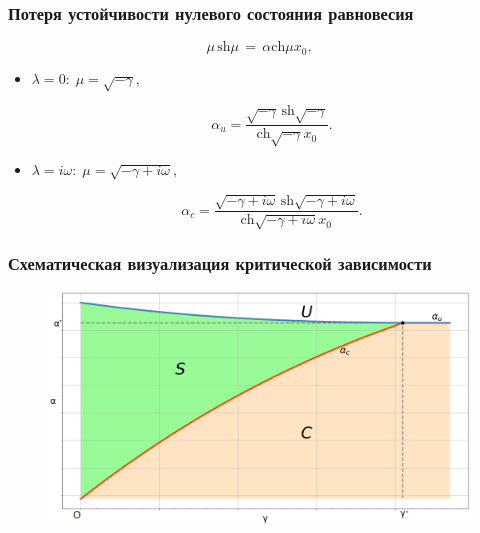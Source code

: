 \documentclass[fullscreen=true, unicode, bookmarks=false]{beamer}
\begin{document}
\begin{frame}
\frametitle{ Потеря устойчивости нулевого состояния равновесия }
 
\begin{equation}
	\mu \, \mbox{sh} \mu \, = \, \alpha \mbox{ch} \mu x_0,
\end{equation}

\medskip
\pause

\begin{itemize}

\item { $ \lambda = 0: \; \mu = \sqrt{-\gamma}, $ 
}

$$ \alpha_u = \frac{ \sqrt{-\gamma} \, \mbox{sh} \sqrt{-\gamma} }{ \mbox{ch} \sqrt{-\gamma} x_0 }. $$

\pause
\item { $ \lambda = i \omega: \; \mu = \sqrt{-\gamma + i \omega}, $ 
}

$$ \alpha_c = \frac{ \sqrt{-\gamma + i \omega} \, \mbox{sh} \sqrt{-\gamma + i \omega} }{ \mbox{ch} \sqrt{-\gamma + i \omega} x_0 }. $$

\end{itemize}	

\end{frame}

\begin{frame}
\frametitle{ Схематическая визуализация критической зависимости }

\begin{figure} 
\includegraphics[scale=0.35]{scheme.png}  
\end{figure}

\end{frame}
\end{document}
